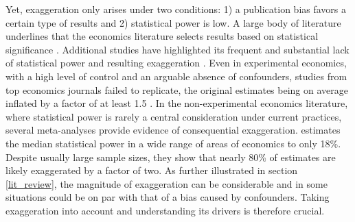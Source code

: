 			Yet, exaggeration only arises under two conditions: 1) a publication bias favors a certain type of results and 2) statistical power is low. A large body of literature underlines that the economics literature selects results based on statistical significance \citep[for instance]{rosenthal_file_1979, brodeur_star_2016, andrews_identification_2019, abadie_statistical_2020, brodeur_methods_2020}. Additional studies have highlighted its frequent and substantial lack of statistical power and resulting exaggeration \citep{ioannidis_power_2017, ferraro_featureis_2020}. %
			Even in experimental economics, with a high level of control and an arguable absence of confounders, studies from top economics journals failed to replicate, the original estimates being on average inflated by a factor of at least 1.5 \citep{camerer_evaluating_2016}. In the non-experimental economics literature, where statistical power is rarely a central consideration under current practices, several meta-analyses provide evidence of consequential exaggeration. \cite{ioannidis_power_2017} estimates the median statistical power in a wide range of areas of economics to only 18\%. Despite %
			usually large sample sizes, they show that nearly 80\% of estimates are likely exaggerated by a factor of two. 
			As further illustrated in section \ref{lit_review}, the magnitude of exaggeration can be considerable and in some situations could be on par with that of a bias caused by confounders.
			Taking exaggeration into account and understanding its drivers is therefore crucial.
			
